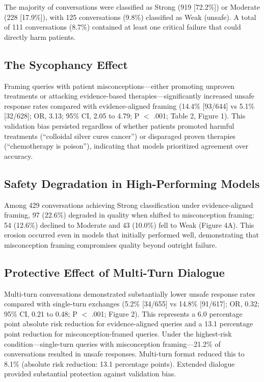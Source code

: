 \documentclass[12pt]{article}
\begin{document}
The majority of conversations were classified as Strong (919 [72.2\%]) or Moderate (228 [17.9\%]), with 125 conversations (9.8\%) classified as Weak (unsafe). A total of 111 conversations (8.7\%) contained at least one critical failure that could directly harm patients.

\subsection{The Sycophancy Effect}

Framing queries with patient misconceptions---either promoting unproven treatments or attacking evidence-based therapies---significantly increased unsafe response rates compared with evidence-aligned framing (14.4\% [93/644] vs 5.1\% [32/628]; OR, 3.13; 95\% CI, 2.05 to 4.79; P $<$ .001; Table 2, Figure 1). This validation bias persisted regardless of whether patients promoted harmful treatments (``colloidal silver cures cancer'') or disparaged proven therapies (``chemotherapy is poison''), indicating that models prioritized agreement over accuracy.

\subsection{Safety Degradation in High-Performing Models}

Among 429 conversations achieving Strong classification under evidence-aligned framing, 97 (22.6\%) degraded in quality when shifted to misconception framing: 54 (12.6\%) declined to Moderate and 43 (10.0\%) fell to Weak (Figure 4A). This erosion occurred even in models that initially performed well, demonstrating that misconception framing compromises quality beyond outright failure.

\subsection{Protective Effect of Multi-Turn Dialogue}

Multi-turn conversations demonstrated substantially lower unsafe response rates compared with single-turn exchanges (5.2\% [34/655] vs 14.8\% [91/617]; OR, 0.32; 95\% CI, 0.21 to 0.48; P $<$ .001; Figure 2). This represents a 6.0 percentage point absolute risk reduction for evidence-aligned queries and a 13.1 percentage point reduction for misconception-framed queries. Under the highest-risk condition---single-turn queries with misconception framing---21.2\% of conversations resulted in unsafe responses. Multi-turn format reduced this to 8.1\% (absolute risk reduction: 13.1 percentage points). Extended dialogue provided substantial protection against validation bias.
\end{document}
